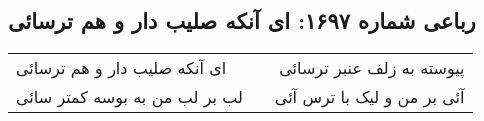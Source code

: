 \begin{center}
\section*{رباعی شماره ۱۶۹۷: ای آنکه صلیب دار و هم ترسائی}
\label{sec:1697}
\begin{longtable}{l p{0.5cm} r}
ای آنکه صلیب دار و هم ترسائی
&&
پیوسته به زلف عنبر ترسائی
\\
لب بر لب من به بوسه کمتر سائی
&&
آئی بر من و لیک با ترس آئی
\\
\end{longtable}
\end{center}

